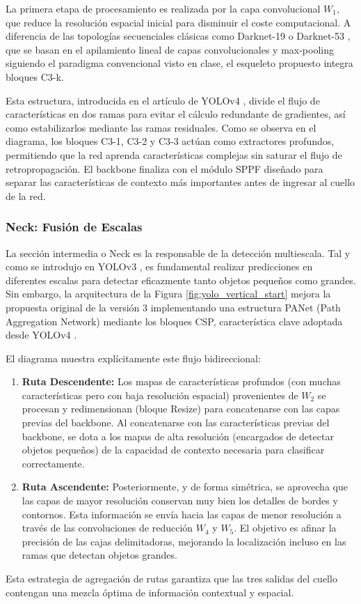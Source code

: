 \documentclass{article}
\begin{document}
	
	La primera etapa de procesamiento es realizada por la capa convolucional $W_1$, que reduce la resolución espacial inicial para disminuir el coste computacional. A diferencia de las topologías secuenciales clásicas como Darknet-19 o Darknet-53 \cite{redmon2016yolo9000betterfasterstronger}  \cite{redmon2018yolov3incrementalimprovement}, que se basan en el apilamiento lineal de capas convolucionales y max-pooling siguiendo el paradigma convencional visto en clase, el esqueleto propuesto integra bloques C3-k.
	
	
	Esta estructura, introducida en el artículo de YOLOv4 \cite{bochkovskiy2020yolov4optimalspeedaccuracy}, divide el flujo de características en dos ramas para evitar el cálculo redundante de gradientes, así como estabilizarlos mediante las ramas residuales. Como se observa en el diagrama, los bloques C3-1, C3-2 y C3-3 actúan como extractores profundos, permitiendo que la red aprenda características complejas sin saturar el flujo de retropropagación. El backbone finaliza con el módulo SPPF diseñado para separar las características de contexto más importantes antes de ingresar al cuello de la red.
	
	\subsubsection{Neck: Fusión de Escalas} La sección intermedia o Neck es la responsable de la detección multiescala. Tal y como se introdujo en YOLOv3 \cite{redmon2018yolov3incrementalimprovement}, es fundamental realizar predicciones en diferentes escalas para detectar eficazmente tanto objetos pequeños como grandes. Sin embargo, la arquitectura de la Figura \ref{fig:yolo_vertical_start} mejora la propuesta original de la versión 3 implementando una estructura PANet (Path Aggregation Network) mediante los bloques CSP, característica clave adoptada desde YOLOv4 \cite{bochkovskiy2020yolov4optimalspeedaccuracy}.
	
	
	El diagrama muestra explícitamente este flujo bidireccional:
	\begin{enumerate}
		\item \textbf{Ruta Descendente:} Los mapas de características profundos (con muchas características pero con baja resolución espacial) provenientes de $W_2$ se procesan y redimensionan (bloque Resize) para concatenarse con las capas previas del backbone.  Al concatenarse con las características previas del backbone, se dota a los mapas de alta resolución (encargados de detectar objetos pequeños) de la capacidad de contexto necesaria para clasificar correctamente.
		\item \textbf{Ruta Ascendente:} Posteriormente, y de forma simétrica, se aprovecha que las capas de mayor resolución conservan muy bien los detalles de bordes y contornos. Esta información se envía hacia las capas de menor resolución a través de las convoluciones de reducción $W_4$ y $W_5$. El objetivo es afinar la precisión de las cajas delimitadoras, mejorando la localización incluso en las ramas que detectan objetos grandes.
	\end{enumerate}
	Esta estrategia de agregación de rutas garantiza que las tres salidas del cuello contengan una mezcla óptima de información contextual y espacial.
	
\end{document}
